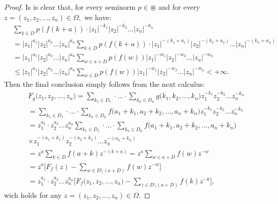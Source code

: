 \documentclass[10pt,a4paper]{amsart}
\begin{document}
\begin{proof}
Is is clear that, for every seminorm $p\in \circledast$ and for every $z=(z_{1},z_{2},\ldots ,z_{n})\in \Omega ,$ we have:
\begin{align*}
& \sum_{k\in D}p(f(k+a))  \cdot \bigl|z_{1}\bigr|^{-k_{1}}\bigl|z_{2}\bigr|^{-k_{2}}\ldots \bigl| z_{n}\bigr|^{-k_{n}}
\\& = \bigl|z_{1}\bigr|^{a_{1}}\bigl|z_{2}\bigr|^{a_{2}}\ldots \bigl| z_{n}\bigr|^{a_{n}} \sum_{k\in D}p(f(k+a)) \cdot \bigl|z_{1}\bigr|^{-(k_{1}+a_{1})}\bigl|z_{2}\bigr|^{-(k_{2}+a_{2})}\ldots \bigl| z_{n}\bigr|^{-(k_{n}+a_{n})}
\\& =\bigl|z_{1}\bigr|^{a_{1}}\bigl|z_{2}\bigr|^{a_{2}}\ldots \bigl| z_{n}\bigr|^{a_{n}} \sum_{w\in a+D}p(f(w))\bigl|z_{1}\bigr|^{-w_{1}}\bigl|z_{2}\bigr|^{-w_{2}}\ldots \bigl| z_{n}\bigr|^{-w_{n}}
\\& \leq \bigl|z_{1}\bigr|^{a_{1}}\bigl|z_{2}\bigr|^{a_{2}}\ldots \bigl| z_{n}\bigr|^{a_{n}} \sum_{w\in D}p(f(w))\bigl|z_{1}\bigr|^{-w_{1}}\bigl|z_{2}\bigr|^{-w_{2}}\ldots \bigl| z_{n}\bigr|^{-w_{n}}<+\infty.
\end{align*}
Then the final conclusion simply follows from the next calculus:{\small
\begin{align*}
& F_{g}\bigl(z_{1},z_{2},\ldots ,z_{n}\bigr)=\sum _{k_{1}\in D_{1} }\cdot ... \cdot \sum _{k_{n}\in D_{n} }g\bigl(k_{1},k_{2},\ldots ,k_{n}\bigr)z_{1}^{-k_{1}}z_{2}^{-k_{2}}\ldots z_{n}^{-k_{n}}
\\& =\sum _{k_{1}\in D_{1} }\cdot ... \cdot \sum _{k_{n}\in D_{n} }f\bigl(a_{1}+k_{1},a_{2}+k_{2},\ldots ,a_{n}+k_{n}\bigr)z_{1}^{-k_{1}}z_{2}^{-k_{2}}\ldots z_{n}^{-k_{n}}
\\& =  z_{1}^{a_{1}}\cdot z_{2} ^{a_{2}}\ldots z_{n}^{a_{n}}\sum _{k_{1}\in D_{1} }\cdot ... \cdot \sum _{k_{n}\in D_{n} }f\bigl(a_{1}+k_{1},a_{2}+k_{2},\ldots ,a_{n}+k_{n}\bigr)
\\& \times z_{1}^{-(a_{1}+k_{1})}z_{2}^{-(a_{2}+k_{2})}\ldots z_{n}^{-(a_{n}+k_{n})}
\\& =z^{a}\sum_{k\in D}f(a+k)z^{-(k+a)}=z^{a}\sum_{w\in a+D}f(w)z^{-w}
\\& =z^{a}\Biggl[ F_{f}(z)-\sum_{w\in D\setminus (a+D)}f(w)z^{-w}\Biggr]
\\& =z_{1}^{a_{1}}\cdot z_{2} ^{a_{2}}\ldots z_{n}^{a_{n}}\Biggl[ F_{f}\bigl(z_{1},z_{2},\ldots ,z_{n}\bigr)-\sum_{z\in D\setminus (a+D)}f(k)z^{-k}\Biggr],
\end{align*}}
wich holds for any $z=(z_{1},z_{2},\ldots ,z_{n})\in \Omega.$
\end{proof}
\end{document}
